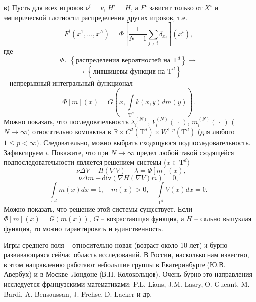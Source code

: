 \begin{problem}
в)  Пусть для всех игроков $\nu ^i=\nu $, $H^i=H$, а $F^i$ зависит 
только от $X^i$ и эмпирической плотности распределения других игроков, т.е.
\[
F^i\left( {x^1,...,x^N} \right)=\Phi \left[ {\frac{1}{N-1}\sum\limits_{j\ne 
i} {\delta _{x_j } } } \right]\left( {x^i} \right),
\]
где
\[
\Phi :\;\left\{ {\mbox{распределения вероятностей на T}^d} \right\}\to 
\]
\[\to
\left\{ {\mbox{липшицевы функции на T}^d} \right\}
\]
-- непрерывный интегральный функционал
\[
\Phi \left[ m \right]\left( x \right)=G\left( {x,\int\limits_{\mbox{T}^d} 
{k\left( {x,y} \right)dm\left( y \right)} } \right).
\]
Можно показать, что последовательность $\lambda _i^{\left( N \right)} $, 
$V_i^{\left( N \right)} \left( {\,\cdot \,} \right)$, $m_i^{\left( N 
\right)} \left( {\,\cdot \,} \right)$ ($N\to \infty )$ относительно 
компактна в ${\mathbb R}\times C^2( {\mbox{T}^d} )\times W^{1,p}( 
{\mbox{T}^d} )$ (для любого $1\le p<\infty )$. Следовательно, можно 
выбрать сходящуюся подпоследовательность. Зафиксируем $i$. Покажите, что при 
$N\to \infty $ предел любой такой сходящейся подпоследовательности является 
решением системы ($x\in \mbox{T}^d)$
\[
-\nu \Delta V+H\left( {\nabla V} \right)+\lambda =\Phi \left[ m 
\right]\left( x \right),
\]
\[
\nu \Delta m+\mbox{div}\left( {\nabla H\left( {\nabla V} \right)m} 
\right)=0,
\]
\[
\int\limits_{\mbox{T}^d} {m\left( x \right)dx} =1,
\quad
m\left( x \right)>0,
\quad
\int\limits_{\mbox{T}^d} {V\left( x \right)dx} =0.
\]
Можно показать, что решение этой системы существует. Если $\Phi \left[ m 
\right]\left( x \right)=G\left( {m\left( x \right)} \right)$, $G$ -- 
возрастающая функция, а $H$ -- сильно выпуклая функция, то можно 
гарантировать и единственность.

\end{problem}

\begin{remark}
 Игры среднего поля -- относительно новая (возраст около 
10 лет) и бурно развивающаяся сейчас область исследований. В России, 
насколько нам известно, в этом направлению работают небольшие группы в 
Екатеринбурге (Ю.В. Авербух) и в Москве--Лондоне (В.Н. Колокольцов). Очень 
бурно это направления исследуется  французскими 
математиками: P.L. Lions, J.M. Lasry, O. Gueant, M. Bardi, A. Bensoussan, J. 
Frehse, D. Lacker и др.
\end{remark}



